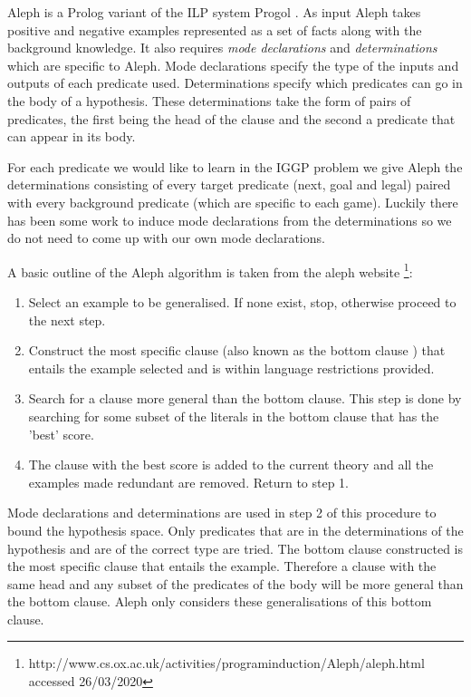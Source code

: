 Aleph is a Prolog variant of the ILP system Progol  \cite{Muggleton/Aleph}. As input Aleph takes positive and negative examples represented as a set of facts along with the background knowledge. It also requires \textit{mode declarations} and \textit{determinations} which are specific to Aleph. Mode declarations specify the type of the inputs and outputs of each predicate used. Determinations specify which predicates can go in the body of a hypothesis. These determinations take the form of pairs of predicates, the first being the head of the clause and the second a predicate that can appear in its body.

For each predicate we would like to learn in the IGGP problem we give Aleph the determinations consisting of every target predicate (next, goal and legal) paired with every background predicate (which are specific to each game). Luckily there has been some work to induce mode declarations from the determinations  \cite{McCreath/Meta-extraction} so we do not need to come up with our own mode declarations.

A basic outline of the Aleph algorithm is taken from the aleph website \footnote{http://www.cs.ox.ac.uk/activities/programinduction/Aleph/aleph.html accessed 26/03/2020}:
\begin{enumerate}
\item Select an example to be generalised. If none exist, stop, otherwise proceed to the
next step.
\item Construct the most specific clause (also known as the bottom clause  \cite{Muggleton/Aleph}) that entails
the example selected and is within language restrictions provided.
\item Search for a clause more general than the bottom clause. This step is done by searching for some subset of the literals in the bottom clause that has the 'best' score.
\item The clause with the best score is added to the current theory and all the examples
made redundant are removed. Return to step 1.
\end{enumerate}

Mode declarations and determinations are used in step 2 of this procedure to bound the hypothesis space. Only predicates that are in the determinations of the hypothesis and are of the correct type are tried. The bottom clause constructed is the most specific clause that entails the example. Therefore a clause with the same head and any subset of the predicates of the body will be more general than the bottom clause. Aleph only considers these generalisations of this bottom clause.

